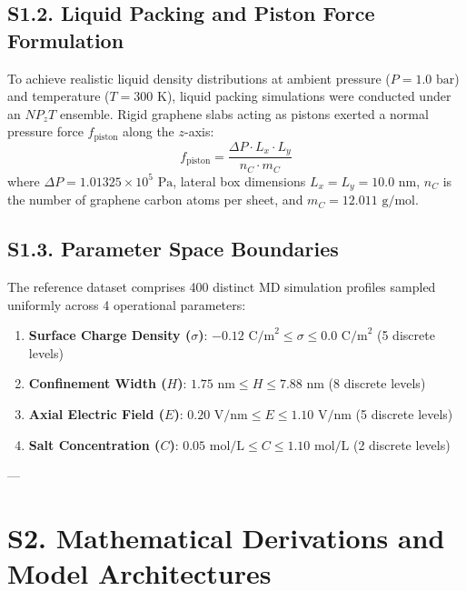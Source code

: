 \documentclass[3p,preprint,12pt,numbers,square,sort&compress]{elsarticle}
\begin{document}
\subsection{S1.2. Liquid Packing and Piston Force Formulation}
To achieve realistic liquid density distributions at ambient pressure ($P = 1.0\text{ bar}$) and temperature ($T = 300\text{ K}$), liquid packing simulations were conducted under an $NP_zT$ ensemble. Rigid graphene slabs acting as pistons exerted a normal pressure force $f_{\text{piston}}$ along the $z$-axis:
\begin{equation}
    f_{\text{piston}} = \frac{\Delta P \cdot L_x \cdot L_y}{n_C \cdot m_C}
    \tag{S3}
\end{equation}
where $\Delta P = 1.01325 \times 10^5\text{ Pa}$, lateral box dimensions $L_x = L_y = 10.0\text{ nm}$, $n_C$ is the number of graphene carbon atoms per sheet, and $m_C = 12.011\text{ g/mol}$.

\subsection{S1.3. Parameter Space Boundaries}
The reference dataset comprises 400 distinct MD simulation profiles sampled uniformly across 4 operational parameters:
\begin{enumerate}
    \item \textbf{Surface Charge Density ($\sigma$)}: $-0.12\text{ C/m}^2 \le \sigma \le 0.0\text{ C/m}^2$ (5 discrete levels)
    \item \textbf{Confinement Width ($H$)}: $1.75\text{ nm} \le H \le 7.88\text{ nm}$ (8 discrete levels)
    \item \textbf{Axial Electric Field ($E$)}: $0.20\text{ V/nm} \le E \le 1.10\text{ V/nm}$ (5 discrete levels)
    \item \textbf{Salt Concentration ($C$)}: $0.05\text{ mol/L} \le C \le 1.10\text{ mol/L}$ (2 discrete levels)
\end{enumerate}

---

\section{S2. Mathematical Derivations and Model Architectures}
\end{document}
